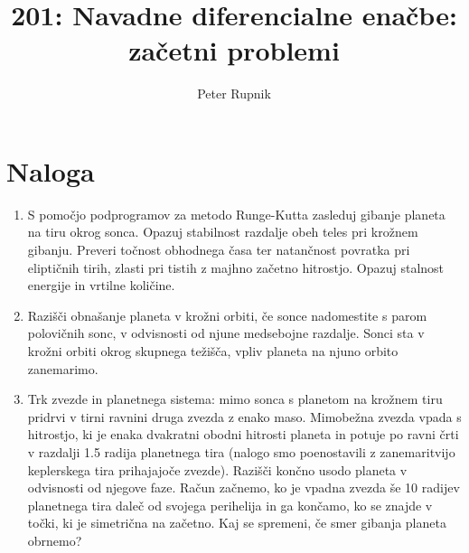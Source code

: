 \documentclass[a4paper,oneside,12pt]{article}
\title{201: Navadne diferencialne enačbe: začetni problemi}
\author{Peter Rupnik}
\begin{document}
\maketitle
\section{Naloga}
\begin{enumerate}

\item S pomočjo podprogramov za metodo Runge-Kutta zasleduj gibanje
  planeta na tiru okrog sonca. Opazuj stabilnost razdalje obeh teles
  pri krožnem gibanju. Preveri točnost obhodnega časa ter  
  natančnost povratka pri eliptičnih tirih, zlasti pri tistih z majhno
  začetno hitrostjo. Opazuj stalnost energije in vrtilne količine.

\item Razišči obnašanje planeta v krožni orbiti,
  če sonce nadomestite s parom polovičnih sonc,
  v odvisnosti od njune medsebojne razdalje.
  Sonci sta v krožni orbiti okrog skupnega težišča, vpliv planeta na njuno
  orbito zanemarimo.

\item Trk zvezde in planetnega sistema: mimo sonca s planetom na
  krožnem tiru pridrvi v tirni ravnini druga zvezda z enako
  maso. Mimobežna zvezda vpada s hitrostjo, ki je enaka dvakratni
  obodni hitrosti planeta in potuje po ravni črti v razdalji 1.5
  radija planetnega tira (nalogo smo poenostavili z zanemaritvijo
  keplerskega tira prihajajoče zvezde).  Razišči končno usodo planeta
  v odvisnosti od njegove faze. Račun začnemo, ko je vpadna zvezda še
  10 radijev planetnega tira daleč od svojega perihelija in ga
  končamo, ko se znajde v točki, ki je simetrična na začetno. Kaj se
  spremeni, če smer gibanja planeta obrnemo?

  
\end{enumerate}


\end{document}

